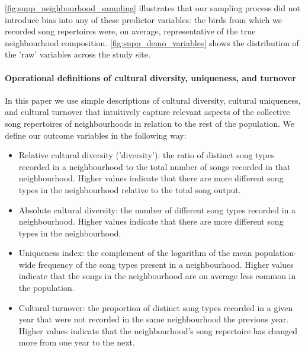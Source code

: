\documentclass[9pt, onecolumn, twoside, lineno]{gsajnl}
\begin{document}
\noindent\autoref{fig:supp_neighbourhood_sampling} illustrates that our sampling process did not introduce bias into any of these predictor variables: the birds from which we recorded song repertoires were, on average, representative of the true neighbourhood composition. \autoref{fig:supp_demo_variables} shows the distribution of the 'raw' variables across the study site.

\paragraph{Operational definitions of cultural diversity, uniqueness, and turnover}
\label{sc:op-definitions}

In this paper we use simple descriptions of cultural diversity, cultural uniqueness, and cultural turnover that intuitively capture relevant aspects of the collective song repertoires of neighbourhoods in relation to the rest of the population. We define our outcome variables in the following way:

\begin{itemize}
    \item Relative cultural diversity ('diversity'): the ratio of distinct song types recorded in a neighbourhood to the total number of songs recorded in that neighbourhood. Higher values indicate that there are more different song types in the neighbourhood relative to the total song output.
    \item Absolute cultural diversity: the number of different song types recorded in a neighbourhood. Higher values indicate that there are more different song types in the neighbourhood.
    \item Uniqueness index: the complement of the logarithm of the mean population-wide frequency of the song types present in a neighbourhood. Higher values indicate that the songs in the neighbourhood are on average less common in the population.
    \item Cultural turnover: the proportion of distinct song types recorded in a given year that were not recorded in the same neighbourhood the previous year. Higher values indicate that the neighbourhood's song repertoire has changed more from one year to the next.
\end{itemize}
\end{document}
